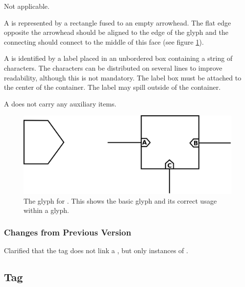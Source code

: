 \begin{glyphDescription}

\glyphSboTerm Not applicable.

\glyphContainer A  is represented by a rectangle fused to
an empty arrowhead.  The
flat edge opposite the arrowhead should be aligned to the edge of the
 glyph and the connecting should connect to the middle
of this face (see figure \ref{fig:submapterminal}). 

\glyphLabel A  is identified by a label placed in an
unbordered box containing a string of characters.  The characters can
be distributed on several lines to improve readability, although this
is not mandatory.  The label box must be attached to the center of the
container. The label may spill outside of the container.

\glyphAux A  does not carry any auxiliary items. 

\end{glyphDescription}

\begin{figure}[H]
  \centering
  \includegraphics[scale = 0.3]{images/submapterminal}
  \caption{The \PD glyph for . This shows the
    basic glyph and its correct usage within a  glyph.}
  \label{fig:submapterminal}
\end{figure}

\subsubsection{Changes from Previous Version}

Clarified that the tag does not link a , but
only instances of .

\subsection{Tag}
\label{defn:Tag}

